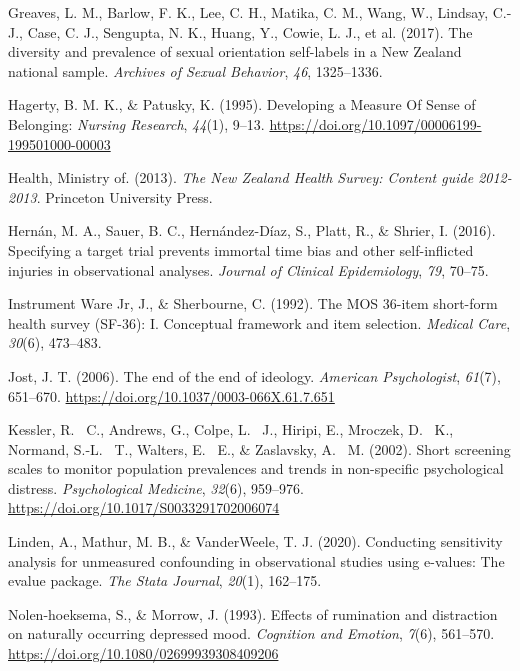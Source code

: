 \documentclass[
  single column]{article}
\newlength{\cslhangindent}
\newenvironment{CSLReferences}[2] %
 {\begin{list}{}{%
  \setlength{\itemindent}{0pt}
  \setlength{\leftmargin}{0pt}
  \setlength{\parsep}{0pt}
  \ifodd #1
   \setlength{\leftmargin}{\cslhangindent}
   \setlength{\itemindent}{-1\cslhangindent}
  \fi
  \setlength{\itemsep}{#2\baselineskip}}}
 {\end{list}}
\begin{document}
\begin{CSLReferences}{1}{0}
Greaves, L. M., Barlow, F. K., Lee, C. H., Matika, C. M., Wang, W.,
Lindsay, C.-J., Case, C. J., Sengupta, N. K., Huang, Y., Cowie, L. J.,
et al. (2017). The diversity and prevalence of sexual orientation
self-labels in a {N}ew {Z}ealand national sample. \emph{Archives of
Sexual Behavior}, \emph{46}, 1325--1336.

Hagerty, B. M. K., \& Patusky, K. (1995). Developing a Measure Of Sense
of Belonging: \emph{Nursing Research}, \emph{44}(1), 9--13.
\url{https://doi.org/10.1097/00006199-199501000-00003}

Health, Ministry of. (2013). \emph{The {N}ew {Z}ealand {H}ealth
{S}urvey: Content guide 2012-2013}. Princeton University Press.

Hernán, M. A., Sauer, B. C., Hernández-Díaz, S., Platt, R., \& Shrier,
I. (2016). Specifying a target trial prevents immortal time bias and
other self-inflicted injuries in observational analyses. \emph{Journal
of Clinical Epidemiology}, \emph{79}, 70--75.

Instrument Ware Jr, J., \& Sherbourne, C. (1992). The MOS 36-item
short-form health survey (SF-36): I. Conceptual framework and item
selection. \emph{Medical Care}, \emph{30}(6), 473--483.

Jost, J. T. (2006). The end of the end of ideology. \emph{American
Psychologist}, \emph{61}(7), 651--670.
\url{https://doi.org/10.1037/0003-066X.61.7.651}

Kessler, R. ~C., Andrews, G., Colpe, L. ~J., Hiripi, E., Mroczek, D.
~K., Normand, S.-L. ~T., Walters, E. ~E., \& Zaslavsky, A. ~M. (2002).
Short screening scales to monitor population prevalences and trends in
non-specific psychological distress. \emph{Psychological Medicine},
\emph{32}(6), 959--976. \url{https://doi.org/10.1017/S0033291702006074}

Linden, A., Mathur, M. B., \& VanderWeele, T. J. (2020). Conducting
sensitivity analysis for unmeasured confounding in observational studies
using e-values: The evalue package. \emph{The Stata Journal},
\emph{20}(1), 162--175.

Nolen-hoeksema, S., \& Morrow, J. (1993). Effects of rumination and
distraction on naturally occurring depressed mood. \emph{Cognition and
Emotion}, \emph{7}(6), 561--570.
\url{https://doi.org/10.1080/02699939308409206}


\end{CSLReferences}
\end{document}
